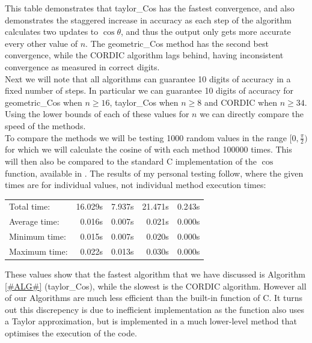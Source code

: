 {This table demonstrates that \textrm{taylor\_Cos} has the fastest convergence, and also demonstrates the staggered increase in accuracy as each step of the algorithm calculates two updates to \(\cos\theta\), and thus the output only gets more accurate every other value of \(n\). The \textrm{geometric\_Cos} method has the second best convergence, while the CORDIC algorithm lags behind, having inconsistent convergence as measured in correct digits.\\

Next we will note that all algorithms can guarantee 10 digits of accuracy in a fixed number of steps. In particular we can guarantee 10 digits of accuracy for \textrm{geometric\_Cos} when \(n \ge 16\), \textrm{taylor\_Cos} when \(n \ge 8\) and \textrm{CORDIC} when \(n \ge 34\). Using the lower bounds of each of these values for \(n\) we can directly compare the speed of the methods.\\

To compare the methods we will be testing 1000 random values in the range \([0, \frac{\pi}{2})\) for which we will calculate the cosine of with each method 100000 times. This will then also be compared to the standard C implementation of the \(\cos\) function, available in . The results of my personal testing follow, where the given times are for individual values, not individual method execution times:

{\selectfont
\begin{center}
\begin{tabular}{|l|r|r|r|r|}
\hline
	& \codeinline{geometric\_cos} & \codeinline{taylor\_cos}
	& \codeinline{cordic\_cos} & \codeinline{builtin\_cos}\\\hline 
	\textsf{Total time:} & 16.029s & 7.937s & 21.471s & 0.243s\\\hline
	\textsf{Average time:} & 0.016s & 0.007s & 0.021s & 0.000s\\\hline
	\textsf{Minimum time:} & 0.015s & 0.007s & 0.020s & 0.000s\\\hline
	\textsf{Maximum time:} & 0.022s & 0.013s & 0.030s & 0.000s\\\hline
\end{tabular}
\end{center}
}

These values show that the fastest algorithm that we have discussed is Algorithm \ref{#ALG#} (\textrm{taylor\_Cos}), while the slowest is the CORDIC algorithm. However all of our Algorithms are much less efficient than the built-in  function of C. It turns out this discrepency is due to inefficient implementation as the  function also uses a Taylor approximation, but is implemented in a much lower-level method that optimises the execution of the code.\\

}
